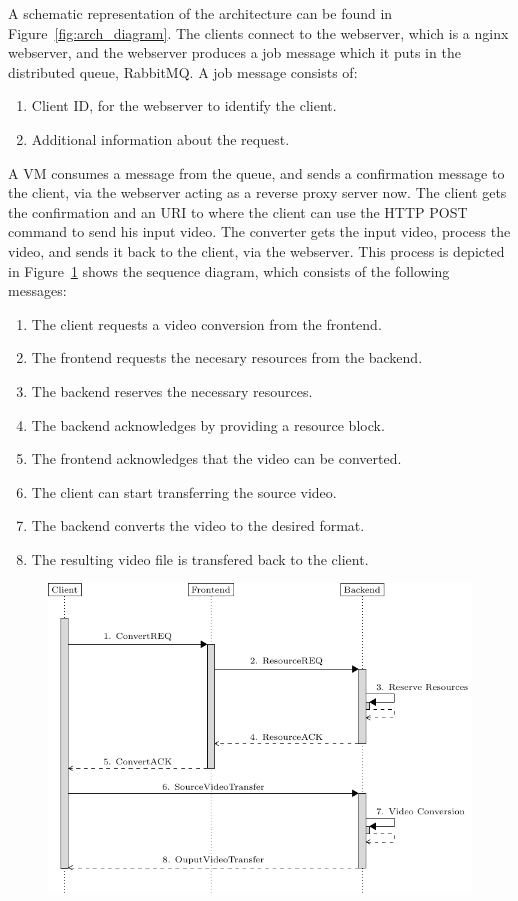 \documentclass[]{article}
\begin{document}
A schematic representation of the architecture can be found in
Figure~\ref{fig:arch_diagram}. The clients connect to the webserver,
which is a nginx webserver, and the webserver produces a job message which it
puts in the distributed queue, RabbitMQ. A job message consists of:
\begin{enumerate}
\item Client ID, for the webserver to identify the client.
\item Additional information about the request.
\end{enumerate}
A VM consumes a message from the queue, and sends a confirmation
message to the client, via the webserver acting as a reverse proxy
server now. The client gets the confirmation and an URI to where the
client can use the HTTP POST command to send his input video. 
The converter gets the input video, process the video, and
sends it back to the client, via the webserver. This process is
depicted in Figure~\ref{fig:sequence_diagram} shows the sequence
diagram, which consists of the following messages:
\begin{enumerate}
\item The client requests a video conversion from the frontend.
\item The frontend requests the necesary resources from the backend.
\item The backend reserves the necessary resources.
\item The backend acknowledges by providing a resource block.
\item The frontend acknowledges that the video can be converted.
\item The client can start transferring the source video.
\item The backend converts the video to the desired format.
\item The resulting video file is transfered back to the client.
\end{enumerate}

\begin{figure}[h]
  \centering
  \includegraphics[width=\linewidth]{sequence_diagram}
  \caption{}
  \label{fig:sequence_diagram}
\end{figure}
\end{document}
